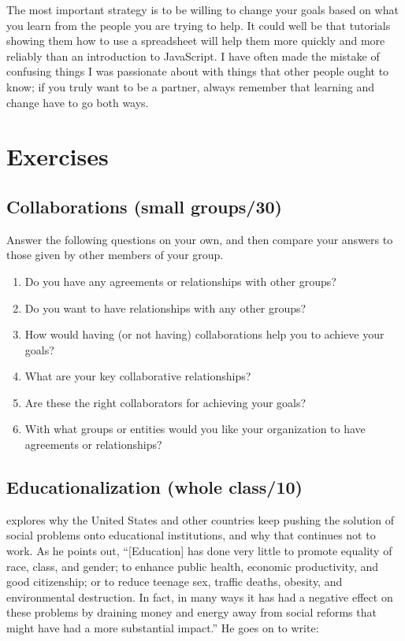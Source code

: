 The most important strategy is to be willing to change your goals based
on what you learn from the people you are trying to help. It could well
be that tutorials showing them how to use a spreadsheet will help them
more quickly and more reliably than an introduction to JavaScript. I
have often made the mistake of confusing things I was passionate about
with things that other people ought to know; if you truly want to be a
partner, always remember that learning and change have to go both ways.

\section{Exercises}\label{s:partner-exercises}

\subsection{Collaborations (small groups/30)}\label{collaborations-small-groups30}

Answer the following questions on your own, and then compare your
answers to those given by other members of your group.

\begin{enumerate}
\item
  Do you have any agreements or relationships with other groups?
\item
  Do you want to have relationships with any other groups?
\item
  How would having (or not having) collaborations help you to achieve
  your goals?
\item
  What are your key collaborative relationships?
\item
  Are these the right collaborators for achieving your goals?
\item
  With what groups or entities would you like your organization to
  have agreements or relationships?
\end{enumerate}

\subsection{Educationalization (whole class/10)}\label{educationalization-whole-class10}

\cite{Laba2008} explores why the United States and other countries
keep pushing the solution of social problems onto educational
institutions, and why that continues not to work. As he points out,
``{[}Education{]} has done very little to promote equality of race,
class, and gender; to enhance public health, economic productivity, and
good citizenship; or to reduce teenage sex, traffic deaths, obesity, and
environmental destruction. In fact, in many ways it has had a negative
effect on these problems by draining money and energy away from social
reforms that might have had a more substantial impact.'' He goes on to
write:


